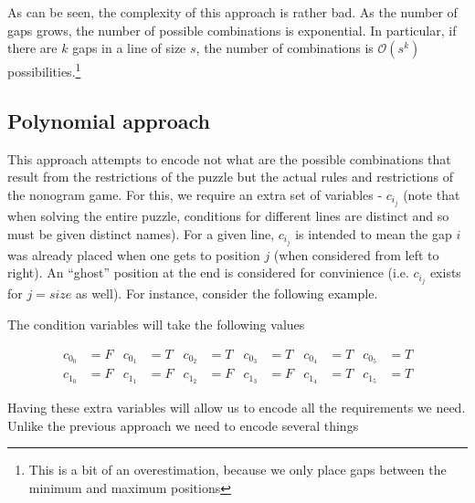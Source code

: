 \documentclass[12pt]{article}
\begin{document}
\noindent As can be seen, the complexity of this approach is rather bad. As the number of gaps grows, the number of possible combinations is exponential. In particular, if there are $k$ gaps in a line of size $s$, the number of combinations is $\mathcal{O}(s^k)$ possibilities.\footnote{This is a bit of an overestimation, because we only place gaps between the minimum and maximum positions}

\subsection*{Polynomial approach}

This approach attempts to encode not what are the possible combinations that result from the restrictions of the puzzle but the actual rules and restrictions of the nonogram game.
For this, we require an extra set of variables - $c_i_j$ (note that when solving the entire puzzle, conditions for different lines are distinct and so must be given distinct names).
For a given line, $c_i_j$ is intended to mean the gap $i$ was already placed when one gets to position $j$ (when considered from left to right). An ``ghost'' position at the end is considered for convinience (i.e. $c_i_{j}$ exists for $j = size$ as well).
For instance, consider the following example.

\begin{center}
\end{center}

\noindent The condition variables will take the following values

\begin{align*}
c_0_0 &= F & c_0_1 &= T & c_0_2 &= T & c_0_3 &= T & c_0_4 &= T & c_0_5 &= T \\
c_1_0 &= F & c_1_1 &= F & c_1_2 &= F & c_1_3 &= F & c_1_4 &= T & c_1_5 &= T
\end{align*}

\noindent Having these extra variables will allow us to encode all the requirements we need. Unlike the previous approach we need to encode several things
\end{document}
